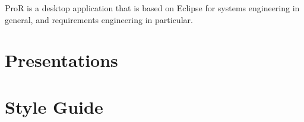 \documentclass[twoside,10pt]{book}
\newcommand{\pror}[0]{ProR}
\begin{document}
\pror{} is a desktop application that is based on Eclipse for systems engineering in general, and requirements engineering in particular.





\chapter{Presentations}
\label{sec:presentations}


\chapter{Style Guide}
\label{sec:styleguide}


\clearpage
{}
{} 
\printindex
\end{document}
